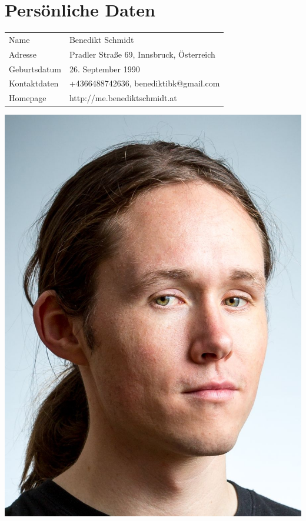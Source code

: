 

	
	\section*{Persönliche Daten}
	\begin{minipage}[t]{13cm}
		\begin{tabularx}{\textwidth}{b{4cm}|l}
			Name & Benedikt Schmidt \\
			Adresse & Pradler Straße 69, Innsbruck, Österreich \\
			Geburtsdatum & 26. September 1990 \\
			Kontaktdaten & +4366488742636, benediktibk@gmail.com \\
			Homepage & http://me.benediktschmidt.at
		\end{tabularx}
	\end{minipage}
	\begin{minipage}[c]{2.5cm}
		\includegraphics[width=\textwidth]{portrait.jpg}
	\end{minipage}

